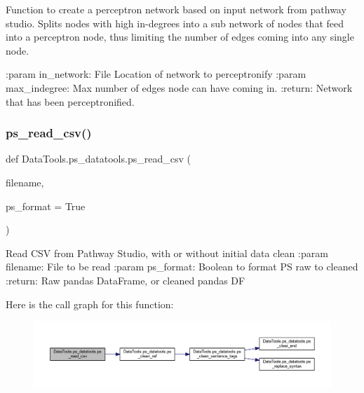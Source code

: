 \begin{DoxyVerb}Function to create a perceptron network based on input network from pathway studio. Splits nodes with high
in-degrees into a sub network of nodes that feed into a perceptron node, thus limiting the number of
edges coming into any single node.

:param in_network: File Location of network to perceptronify
:param max_indegree: Max number of edges node can have coming in.
:return: Network that has been perceptronified.
\end{DoxyVerb}
 \mbox{\label{namespace_data_tools_1_1ps__datatools_abadfbf72a9e40c0db140a1d52a04b2ad}} 
\subsubsection{\texorpdfstring{ps\+\_\+read\+\_\+csv()}{ps\_read\_csv()}}
{\footnotesize\ttfamily def Data\+Tools.\+ps\+\_\+datatools.\+ps\+\_\+read\+\_\+csv (\begin{DoxyParamCaption}\item[{}]{filename,  }\item[{}]{ps\+\_\+format = {\ttfamily True} }\end{DoxyParamCaption})}

\begin{DoxyVerb}Read CSV from Pathway Studio, with or without initial data clean
:param filename: File to be read
:param ps_format: Boolean to format PS raw to cleaned
:return: Raw pandas DataFrame, or cleaned pandas DF
\end{DoxyVerb}
 Here is the call graph for this function\+:
\nopagebreak
\begin{figure}[H]
\begin{center}
\leavevmode
\includegraphics[width=350pt]{namespace_data_tools_1_1ps__datatools_abadfbf72a9e40c0db140a1d52a04b2ad_cgraph}
\end{center}
\end{figure}
\mbox{\label{namespace_data_tools_1_1ps__datatools_ab46896b61f3a03e9f6c6ff5ab9a1dffe}} 
